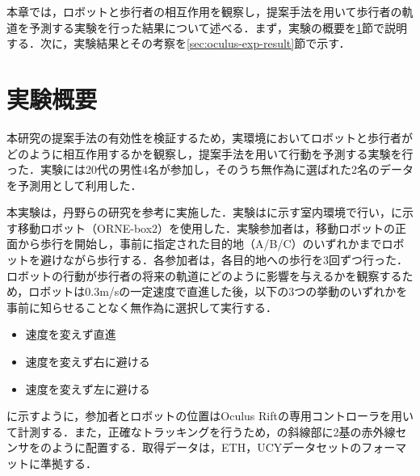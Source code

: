 


本章では，ロボットと歩行者の相互作用を観察し，提案手法を用いて歩行者の軌道を予測する実験を行った結果について述べる．まず，実験の概要を\ref{sec:oculus-exp-overview}節で説明する．次に，実験結果とその考察を\ref{sec:oculus-exp-result}節で示す．

\section{実験概要}\label{sec:oculus-exp-overview}
本研究の提案手法の有効性を検証するため，実環境においてロボットと歩行者がどのように相互作用するかを観察し，提案手法を用いて行動を予測する実験を行った．実験には20代の男性4名が参加し，そのうち無作為に選ばれた2名のデータを予測用として利用した．

本実験は，丹野らの研究\cite{si2023-tanno}を参考に実施した．実験はに示す室内環境で行い，に示す移動ロボット（ORNE-box2\cite{井口颯人2023屋外自律移動ロボットプラットフォーム-orne}）を使用した．実験参加者は，移動ロボットの正面から歩行を開始し，事前に指定された目的地（A/B/C）のいずれかまでロボットを避けながら歩行する．各参加者は，各目的地への歩行を3回ずつ行った．ロボットの行動が歩行者の将来の軌道にどのように影響を与えるかを観察するため，ロボットは0.3m/sの一定速度で直進した後，以下の3つの挙動のいずれかを事前に知らせることなく無作為に選択して実行する．

\newpage
\begin{itemize}
  \item 速度を変えず直進
  \item 速度を変えず右に避ける
  \item 速度を変えず左に避ける
\end{itemize}

に示すように，参加者とロボットの位置はOculus Riftの専用コントローラを用いて計測する．また，正確なトラッキングを行うため，の斜線部に2基の赤外線センサをのように配置する．取得データは，ETH\cite{pellegrini2009you-eth}，UCY\cite{lerner2007crowds-ucy}データセットのフォーマットに準拠する．

